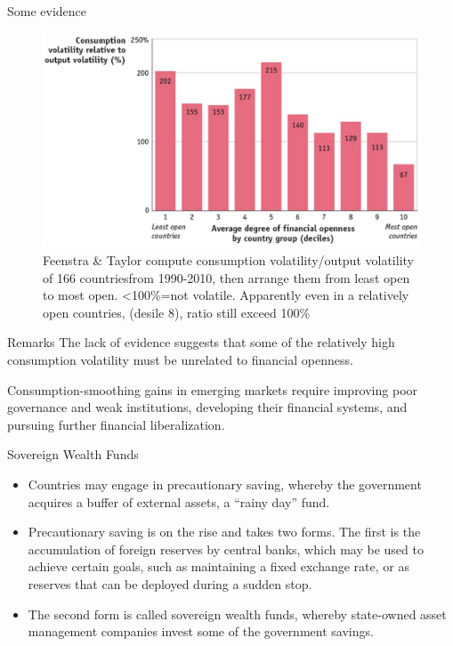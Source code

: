 \documentclass[
  ignorenonframetext,
]{beamer}
\begin{document}
\begin{frame}{Some evidence}
\label{some-evidence}
\begin{figure}[H]

{\centering \includegraphics{Picture1.jpg}

}

\caption{Feenstra \& Taylor compute consumption volatility/output
volatility of 166 countriesfrom 1990-2010, then arrange them from least
open to most open. \textless100\%=not volatile. Apparently even in a
relatively open countries, (desile 8), ratio still exceed 100\%}

\end{figure}%
\end{frame}

\begin{frame}{Remarks}
\label{remarks}
The lack of evidence suggests that some of the relatively high
consumption volatility must be unrelated to financial openness.

Consumption-smoothing gains in emerging markets require improving poor
governance and weak institutions, developing their financial systems,
and pursuing further financial liberalization.
\end{frame}

\begin{frame}{Sovereign Wealth Funds}
\label{sovereign-wealth-funds}
\begin{itemize}
\item
  Countries may engage in precautionary saving, whereby the government
  acquires a buffer of external assets, a ``rainy day'' fund.
\item
  Precautionary saving is on the rise and takes two forms. The first is
  the accumulation of foreign reserves by central banks, which may be
  used to achieve certain goals, such as maintaining a fixed exchange
  rate, or as reserves that can be deployed during a sudden stop.
\item
  The second form is called sovereign wealth funds, whereby state-owned
  asset management companies invest some of the government savings.
\end{itemize}
\end{frame}
\end{document}
